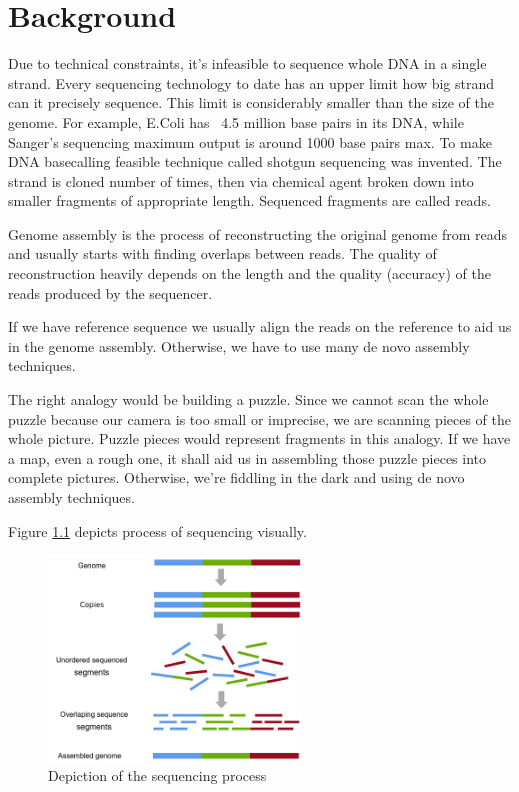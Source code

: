 \documentclass[times, utf8, diplomski, english]{fer}
\begin{document}

\chapter{Background}
\label{chap:background}
Due to technical constraints, it's infeasible to sequence whole DNA in a single strand. 
Every sequencing technology to date has an upper limit how big strand can it precisely sequence.
This limit is considerably smaller than the size of the genome.
For example, E.Coli has ~4.5 million base pairs in its DNA, while Sanger's sequencing maximum output is around 1000 base pairs max.
To make DNA basecalling feasible technique called shotgun sequencing was invented. 
The strand is cloned number of times, then via chemical agent broken down into smaller fragments of appropriate length. 
Sequenced fragments are called reads.

Genome assembly is the process of reconstructing the original genome from reads and usually starts with finding overlaps between reads.
The quality of reconstruction heavily depends on the length and the quality (accuracy) of the reads produced by the sequencer. 

If we have reference sequence we usually align the reads on the reference to aid us in the genome assembly. Otherwise, we have to use many de novo assembly techniques.

The right analogy would be building a puzzle. Since we cannot scan the whole puzzle because our camera is too small or imprecise, we are scanning pieces of the whole picture. Puzzle pieces would represent fragments in this analogy. If we have a map, even a rough one, it shall aid us in assembling those puzzle pieces into complete pictures. Otherwise, we're fiddling in the dark and using de novo assembly techniques.

Figure \ref{fg:sequencing} depicts process of sequencing visually.

\begin{figure}[!ht]
    \begin{center}
        \includegraphics[width=0.6\textwidth]{shotgun-sequencing}
        \caption{Depiction of the sequencing process}
        \label{fg:sequencing}
    \end{center}
\end{figure}
\end{document}
